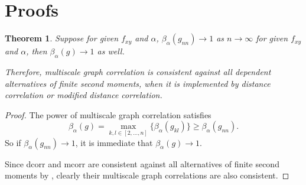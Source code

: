 \documentclass[11pt]{article}
\newtheorem{appThm}{Theorem}
\begin{document}
\section{Proofs}
\label{appen:proofs}
\begin{appThm}
Suppose for given $f_{xy}$ and $\alpha$, $\beta_{\alpha}(g_{nn}) \rightarrow 1$ as $n \rightarrow \infty$ for given $f_{xy}$ and $\alpha$, then $\beta_{\alpha}(g) \rightarrow 1$ as well.

Therefore, multiscale graph correlation is consistent against all dependent alternatives of finite second moments, when it is implemented by distance correlation or modified distance correlation.
\end{appThm}
\begin{proof}
The power of multiscale graph correlation satisfies
\begin{equation}
\beta_{\alpha}(g)=\max_{k,l \in [2,\ldots,n]}\{\beta_{\alpha}(g_{kl})\} \geq \beta_{\alpha}(g_{nn}).
\end{equation}
So if $\beta_{\alpha}(g_{nn}) \rightarrow 1$, it is immediate that $\beta_{\alpha}(g) \rightarrow 1$.

Since dcorr and mcorr are consistent against all alternatives of finite second moments by \cite{SzekelyRizzoBakirov2007, SzekelyRizzo2013a}, clearly their multiscale graph correlations are also consistent.
\end{proof}
\end{document}

